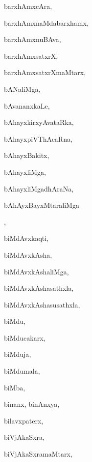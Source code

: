 \begin{multicols}{3}
{\noindent
{barxhAmxcAra}, \pageref{barxhAmxcAra}

\noindent
{barxhAmxnaMdabarxhamx}, \pageref{barxhAmxnaMdabarxhamx}

\noindent
{barxhAmxnuBAva}, \pageref{barxhAmxnuBAva}

\noindent
{barxhAmxsatxrX}, \pageref{barxhAmxsatxrX}

\noindent
{barxhAmxsatxrXmaMtarx}, \pageref{barxhAmxsatxrXmaMtarx}

\noindent
{bANaliMga}, \pageref{bANaliMga}

\noindent
{bAvananxkaLe}, \pageref{bAvananxkaLe}

\noindent
{bAhayxkirxyAvataRka}, \pageref{bAhayxkirxyAvataRka}

\noindent
{bAhayxpiVThAcaRna}, \pageref{bAhayxpiVThAcaRna}

\noindent
{bAhayxBakitx}, \pageref{bAhayxBakitx}

\noindent
{bAhayxliMga}, \pageref{bAhayxliMga}

\noindent
{bAhayxliMgadhAraNa}, \pageref{bAhayxliMgadhAraNa}

\noindent
{bAhAyxBayxMtaraliMga}

\noindent
{}, \pageref{bAhAyxBayxMtaraliMgasaMyoVgasathxla}

\noindent
{biMdAvxkaqti}, \pageref{biMdAvxkaqti}

\noindent
{biMdAvxkAsha}, \pageref{biMdAvxkAsha}

\noindent
{biMdAvxkAshaliMga}, \pageref{biMdAvxkAshaliMga}

\noindent
{biMdAvxkAshasathxla}, \pageref{biMdAvxkAshasathxla}

\noindent
{biMdAvxkAshasusathxla}, \pageref{biMdAvxkAshasusathxla}

\noindent
{biMdu}, \pageref{biMdu}

\noindent
{biMducakarx}, \pageref{biMducakarx}

\noindent
{biMduja}, \pageref{biMduja}

\noindent
{biMdumala}, \pageref{biMdumala}

\noindent
{biMba}, \pageref{biMba}

\noindent
{binanx, binAnxya}, \pageref{binanx, binAnxya}

\noindent
{bilavxpaterx}, \pageref{bilavxpaterx}

\noindent
{biVjAkaSxra}, \pageref{biVjAkaSxra}

\noindent
{biVjAkaSxramaMtarx}, \pageref{biVjAkaSxramaMtarx}

}
\end{multicols}
